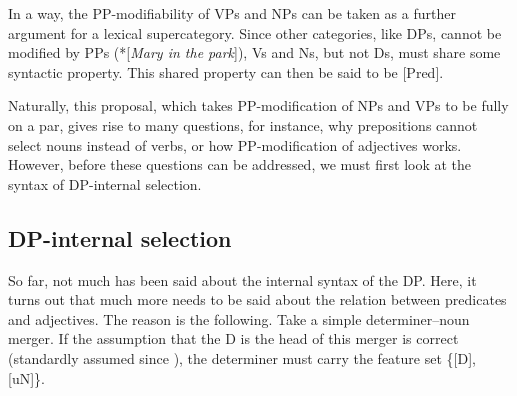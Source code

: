 \documentclass[output=paper
,modfonts
,nonflat]{langsci/langscibook}
\begin{document}
\begin{figure}[!h]
	\begin{exe}
	\end{exe} \vspace{-0.6cm}
\end{figure} 
\noindent In a way, the PP-modifiability of VPs and NPs can be taken as a further argument for a lexical supercategory. Since other categories, like DPs, cannot be modified by PPs (*[\textit{Mary in the park}]), Vs and Ns, but not Ds, must share some syntactic property. This shared property can then be said to be [Pred].

Naturally, this proposal, which takes PP-modification of NPs and VPs to be fully on a par, gives rise to many questions, for instance, why prepositions cannot select nouns instead of verbs, or how PP-modification of adjectives works. However, before these questions can be addressed, we must first look at the syntax of DP-internal selection.

\subsection{DP-internal selection}
So far, not much has been said about the internal syntax of the DP. Here, it turns out that much more needs to be said about the relation between predicates and adjectives. The reason is the following. Take a simple determiner–noun merger. If the assumption that the D is the head of this merger is correct (standardly assumed since \citealt{Abney1987}), the determiner must carry the feature set \{[D], [uN]\}.  
\end{document}
